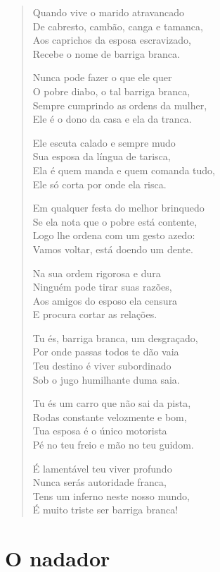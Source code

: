 \begin{verse}
Quando vive o marido atravancado\\
De cabresto, cambão, canga e tamanca,\\
Aos caprichos da esposa escravizado,\\
Recebe o nome de barriga branca.

Nunca pode fazer o que ele quer\\
O pobre diabo, o tal barriga branca,\\
Sempre cumprindo as ordens da mulher,\\
Ele é o dono da casa e ela da tranca.

Ele escuta calado e sempre mudo\\
Sua esposa da língua de tarisca,\\
Ela é quem manda e quem comanda tudo,\\
Ele só corta por onde ela risca.

Em qualquer festa do melhor brinquedo\\
Se ela nota que o pobre está contente,\\
Logo lhe ordena com um gesto azedo:\\
Vamos voltar, está doendo um dente.

Na sua ordem rigorosa e dura\\
Ninguém pode tirar suas razões,\\
Aos amigos do esposo ela censura\\
E procura cortar as relações.

Tu és, barriga branca, um desgraçado,\\
Por onde passas todos te dão vaia\\
Teu destino é viver subordinado\\
Sob o jugo humilhante duma saia.

Tu és um carro que não sai da pista,\\
Rodas constante velozmente e bom,\\
Tua esposa é o único motorista\\
Pé no teu freio e mão no teu guidom.

É lamentável teu viver profundo\\
Nunca serás autoridade franca,\\
Tens um inferno neste nosso mundo,\\
É muito triste ser barriga branca!
\end{verse}

\section*{O nadador}


